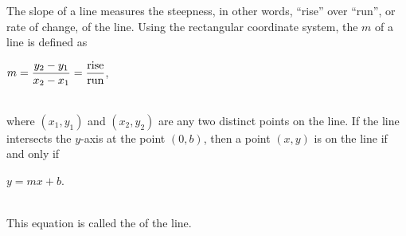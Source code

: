 
\begin{tcolorbox}[colback=white,colframe=cyan, title filled=false, coltitle=cyan, enhanced, attach boxed title to top center={yshift=-3mm,yshifttext=-1mm}, fonttitle=\bfseries, boxed title style={size=small,colback=white}, before upper={\parindent15pt},
title={The slope-intercept form equation}]
The slope of a line measures the steepness, in other words, ``rise'' over ``run'', or rate of change,  of the line. Using the rectangular coordinate  system, the  $m$ of a line is defined as\\ 
\centerline{$m=\dfrac{y_2-y_1}{x_2-x_1}=\dfrac{\textup{rise}}{\textup{run}}$,}\\
 where $(x_1, y_1)$ and $(x_2, y_2)$ are any two distinct points on the line. If the line intersects the $y$-axis at the point $(0, b)$, then a point $(x, y)$ is on the line if and only if\\ \centerline{$y=mx+b$.}\\ This equation is called the  of the line.
\end{tcolorbox}


%
%
%



